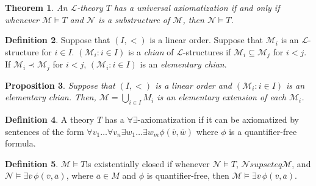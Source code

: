 \documentclass{amsart}
\newtheorem{theorem}{Theorem}[section]
\newtheorem{proposition}[theorem]{Proposition}
\theoremstyle{definition}
\newtheorem{definition}[theorem]{Definition}
\numberwithin{equation}{section}
\begin{document}
\begin{theorem}
    An $\mathcal{L}$-theory $T$ has a universal axiomatization if and only if 
    whenever $\mathcal{M} \models T$ and $\mathcal{N}$ is a substructure of $\mathcal{M}$,
    then $\mathcal{N} \models T$.
\end{theorem}

\begin{definition}
    Suppose that $(I,<)$ is a linear order.
    Suppose that $\mathcal{M}_i$ is an $\mathcal{L}$-structure for $i \in I$.
    $(\mathcal{M}_i: i \in I)$ is a \emph{chian} of $\mathcal{L}$-structures if $\mathcal{M}_i \subseteq \mathcal{M}_j$ for $i < j$.
    If $\mathcal{M}_i \prec \mathcal{M}_j$ for $i < j$,
    $(\mathcal{M}_i: i \in I)$ is an \emph{elementary chian}.
\end{definition}

\begin{proposition}
    Suppose that $(I,<)$ is a linear order and 
    $(\mathcal{M}_i: i \in I)$ is an elementary chian.
    Then, $\mathcal{M} = \bigcup_{i\in I} M_i$ is an elementary extension of each $\mathcal{M}_i$.
\end{proposition}

\begin{definition}
    A theory $T$ has a $\forall\exists$-axiomatization if it can be axiomatized by sentences of the form $\forall v_1\dots\forall v_n \exists w_1\dots \exists w_m \phi(\overline{v},\overline{w})$ 
    where $\phi$ is a quantifier-free formula.
\end{definition}

\begin{definition}
    $\mathcal{M} \models T$is existentially closed 
    if whenever $\mathcal{N} \models T$, $\mathcal{N} supseteq \mathcal{M}$, 
    and $\mathcal{N} \models \exists \overline{v}\, \phi(\overline{v},\overline{a})$, 
    where $\overline{a} \in M$ and $\phi$ is quantifier-free,
    then $\mathcal{M} \models \exists \overline{v} \, \phi(\overline{v},\overline{a})$.
\end{definition}
\end{document}
